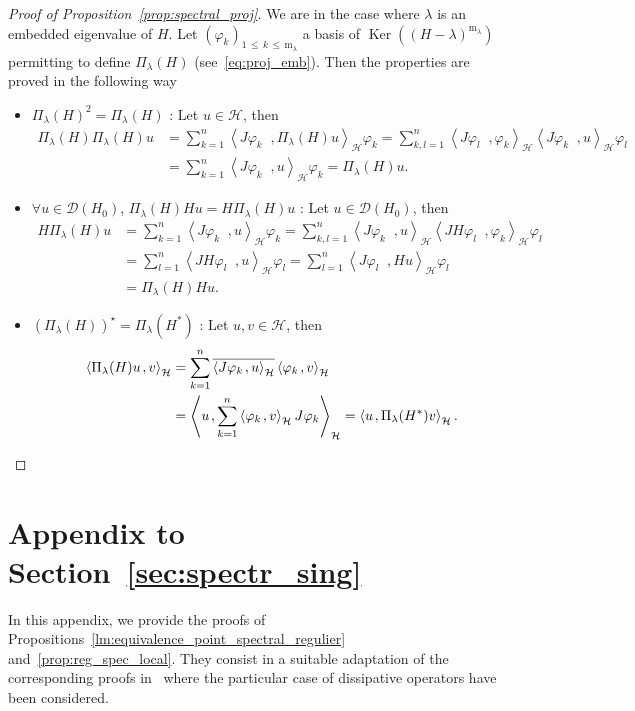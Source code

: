 \documentclass[AHL,Unicode,longabstracts,published]{cedram}
\newcommand{\Hi}{\mathcal{H}}
\newcommand{\rmm}{\mathrm{m}}
\newcommand{\scal}[2]{\left\langle{#1} \middle., {#2}\right\rangle}
\newcommand{\clD}{\mathcal{D}}
\DeclareMathOperator{\Ker}{Ker}
\let\oldforall\forall
\renewcommand*{\forall}{\mathrel{\oldforall}}
\newcommand{\Hi}{\mathcal{H}}
\begin{document}
\begin{proof}[Proof of Proposition~\ref{prop:spectral_proj}]
We are in the case where $\lambda$ is an embedded eigenvalue of $H$. Let $(\varphi_k)_{1\,\leq\,k\,\leq\,\rmm_\lambda}$ a basis of $\Ker((H-\lambda)^{\rmm_\lambda})$ permitting to define $\Pi_\lambda(H)$ (see~\eqref{eq:proj_emb}). Then the properties are proved in the following way
\begin{itemize}
\item $\Pi_\lambda(H)^2=\Pi_\lambda(H)$ : Let $u\in\Hi$, then
\begin{align*}
\Pi_\lambda(H)\Pi_\lambda(H)u&=\sum_{k=1}^n\scal{J\varphi_k}{\Pi_\lambda(H)u}_\Hi\varphi_k=\sum_{k,l=1}^n\scal{J\varphi_l}{\varphi_k}_\Hi\scal{J\varphi_k}{u}_\Hi\varphi_l\\
&=\sum_{k=1}^n\scal{J\varphi_k}{u}_\Hi\varphi_k=\Pi_\lambda(H)u.
\end{align*}
\item $\forall u\in\clD(H_0)$, $\Pi_\lambda(H)Hu=H\Pi_\lambda(H)u$ : Let $u\in\clD(H_0)$, then
\begin{align*}
H\Pi_\lambda(H)u&=\sum_{k=1}^n\scal{J\varphi_k}{u}_\Hi\varphi_k=\sum_{k,l=1}^n\scal{J\varphi_k}{u}_\Hi\scal{JH\varphi_l}{\varphi_k}_\Hi\varphi_l\\
&=\sum_{l=1}^n\scal{JH\varphi_l}{u}_\Hi\varphi_l=\sum_{l=1}^n\scal{J\varphi_l}{Hu}_\Hi\varphi_l\\
&=\Pi_\lambda(H)Hu.
\end{align*}
\item $(\Pi_\lambda(H))^\star=\Pi_\lambda(H^*)$ : Let $u,v\in\Hi$, then
\begin{align*}
\scal{\Pi_\lambda(H)u}{v}_\Hi&=\sum_{k=1}^n\overline{\scal{J\varphi_k}{u}_\Hi}\scal{\varphi_k}{v}_\Hi\\
&=\scal{u}{\sum_{k=1}^n\scal{\varphi_k}{v}_\Hi J\varphi_k}_\Hi=\scal{u}{\Pi_\lambda(H^*)v}_\Hi.\qedhere
\end{align*}
\end{itemize}
\end{proof}

\section{Appendix to Section~\ref{sec:spectr_sing}}\label{App:Propriétés_point_spect_reg}

In this appendix, we provide the proofs of Propositions~\ref{lm:equivalence_point_spectral_regulier} and~\ref{prop:reg_spec_local}. They consist in a suitable adaptation of the corresponding proofs in~\cite{FaNi18_01} where the particular case of dissipative operators have been considered.
\end{document}
